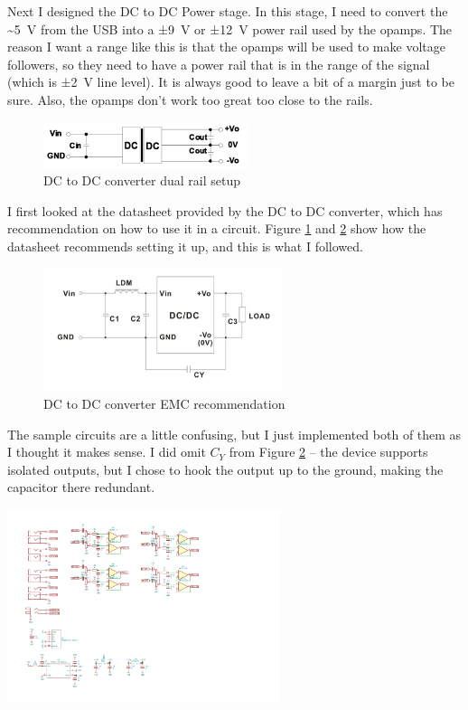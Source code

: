 \documentclass[a4paper]{article}
\begin{document}
Next I designed the DC to DC Power stage. In this stage, I need to convert the \textasciitilde\SI{5}{\volt} from the USB into a ±\SI{9}{\volt} or ±\SI{12}{\volt} power rail used by the opamps. The reason I want a range like this is that the opamps will be used to make voltage followers, so they need to have a power rail that is in the range of the signal (which is ±\SI{2}{\volt} line level). It is always good to leave a bit of a margin just to be sure. Also, the opamps don't work too great too close to the rails.

\begin{figure}[h!]
\centering
\includegraphics[width=6cm]{images/pdme-dual}
\caption{DC to DC converter dual rail setup}
\label{fig:pdme-dual}
\end{figure}

I first looked at the datasheet provided by the DC to DC converter, which has recommendation on how to use it in a circuit. Figure \ref{fig:pdme-dual} and \ref{fig:pdme-emc} show how the datasheet recommends setting it up, and this is what I followed.

\begin{figure}[h!]
\centering
\includegraphics[width=7cm]{images/pdme-emc}
\caption{DC to DC converter EMC recommendation}
\label{fig:pdme-emc}
\end{figure}

The sample circuits are a little confusing, but I just implemented both of them as I thought it makes sense. I did omit $C_Y$ from Figure \ref{fig:pdme-emc} -- the device supports isolated outputs, but I chose to hook the output up to the ground, making the capacitor there redundant.

\begin{center}
  \includegraphics[trim={2cm 1.5cm 21cm 16cm},width=8cm,clip]{images/audio-mixer.pdf}
\end{center}
\end{document}
